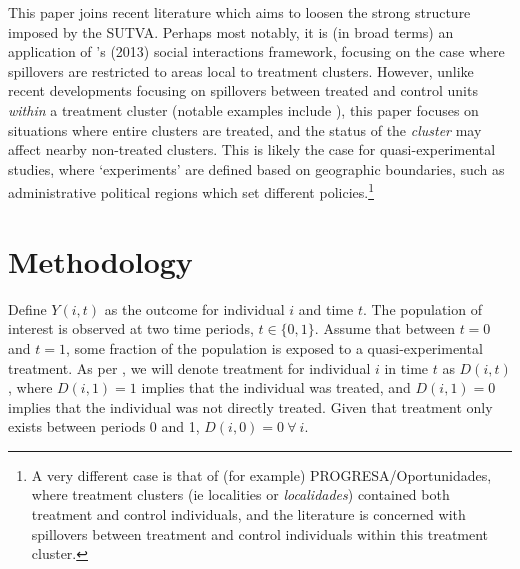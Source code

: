 This paper joins recent literature which aims to loosen the strong structure 
imposed by the SUTVA.  Perhaps most notably, it is (in broad terms) an 
application of \citeauthor{Manski2013}'s (2013) social interactions framework, 
focusing on the case where spillovers are restricted to areas local to treatment 
clusters.  However, unlike recent developments focusing on spillovers 
between treated and control units \emph{within} a treatment cluster (notable
examples include \citet{McIntosh2008,Bairdetal2014,AngelucciDiMaro2010}), this 
paper focuses on situations where entire clusters are treated, and the status
of the \emph{cluster} may affect nearby non-treated clusters.  This is likely
the case for quasi-experimental studies, where `experiments' are defined based
on geographic boundaries, such as administrative political regions which set 
different policies.\footnote{A very different case is that of (for example)
PROGRESA/Oportunidades, where treatment clusters (ie localities or 
\emph{localidades}) contained both treatment and control individuals, and the
literature is concerned with spillovers between treatment and control individuals
within this treatment cluster.}

\nocite{AngelucciDeGiorgi2009} \nocite{Heckmanetal1998}
\nocite{MiguelKremer2004}
 \nocite{Heckmanetal1998b}

\section{Methodology}
Define $Y(i,t)$ as the outcome for individual $i$ and time $t$.  The population
of interest is observed at two time periods, $t\in \{0,1\}$. Assume that between
$t=0$ and $t=1$, some fraction of the population is exposed to a 
quasi-experimental treatment.  As per \citet{Abadie2005}, we will denote 
treatment for individual $i$ in time $t$ as $D(i,t)$, where $D(i,1)=1$ implies 
that the individual was treated, and $D(i,1)=0$ implies that the individual was
not directly treated.  Given that treatment only exists between periods 0 and 1,
$D(i,0)=0\ \forall\ i$.


